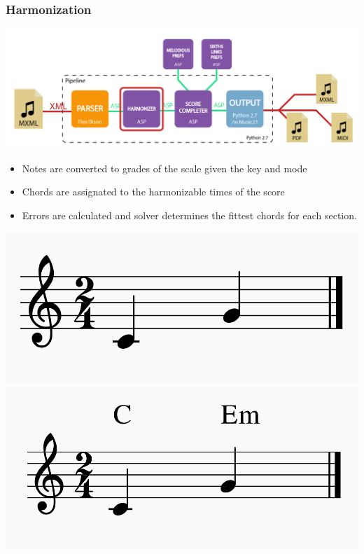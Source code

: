 \documentclass[english]{beamer}
\begin{document}
	\begin{frame}[t]
	\frametitle{Harmonization}
	\begin{center}
			\includegraphics[width=0.6\linewidth]{imagenes/arch_trans/arquitectura_final_asp_harm-01.png}
	\end{center}
	\begin{itemize}
		\item Notes are converted to grades of the scale given the key and mode
		\item Chords are assignated to the harmonizable times of the score
		\item Errors are calculated and solver determines the fittest chords for each section.
	\end{itemize}
	\begin{center}
			\includegraphics[width=0.39\linewidth]{imagenes/example_notes.png}
			\includegraphics[width=0.39\linewidth]{imagenes/harmonized_example.png}
	\end{center}

	\end{frame}
\end{document}
